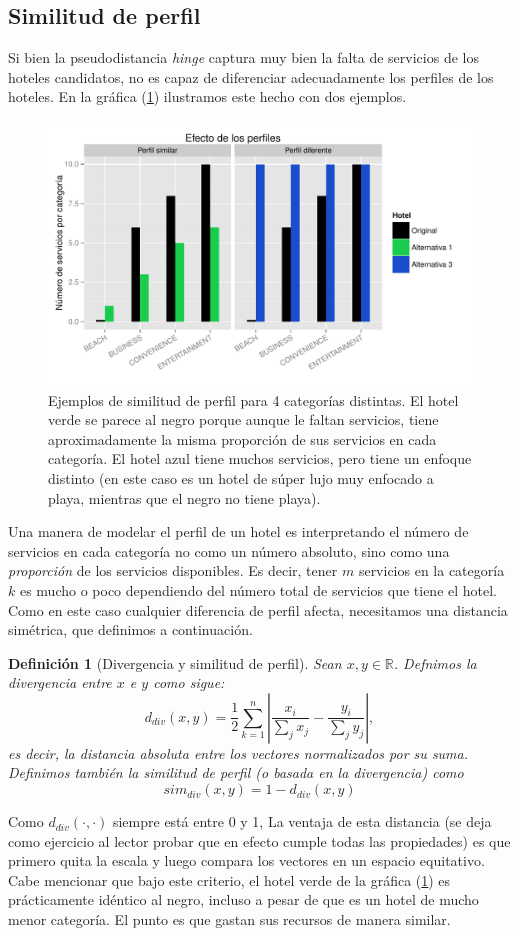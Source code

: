 \documentclass[12pt]{report}
\newtheorem{defn}{Definici\'on}[chapter]
\begin{document}
\subsection*{Similitud de perfil}

Si bien la pseudodistancia \emph{hinge} captura muy bien la falta de servicios de los hoteles candidatos, no es capaz de diferenciar adecuadamente los perfiles de los hoteles. En la gráfica (\ref{simperf}) ilustramos este hecho con dos ejemplos.
\begin{figure}[ht]
	\centering
	\includegraphics[width=\textwidth]{imagenes/simperf.pdf}
	\caption{\label{simperf} Ejemplos de similitud de perfil para 4 categorías distintas. El hotel verde se parece al negro porque aunque le faltan servicios, tiene aproximadamente la misma proporción de sus servicios en cada categoría. El hotel azul tiene muchos servicios, pero tiene un enfoque distinto (en este caso es un hotel de súper lujo muy enfocado a playa, mientras que el negro no tiene playa).}
\end{figure}
Una manera de modelar el perfil de un hotel es interpretando el número de servicios en cada categoría no como un número absoluto, sino como una \emph{proporción} de los servicios disponibles. Es decir, tener $m$ servicios en la categoría $k$ es mucho o poco dependiendo del número total de servicios que tiene el hotel. Como en este caso cualquier diferencia de perfil afecta, necesitamos una distancia simétrica, que definimos a continuación.
\begin{defn}[Divergencia y similitud de perfil]
Sean $x, y \in \mathbb{R}$. Defnimos la divergencia entre $x$ e $y$ como sigue:
\[
d_{div}(x, y) = \frac{1}{2}\sum_{k=1}^n \left|\frac{x_i}{\sum_j x_j} - \frac{y_i}{\sum_j y_j}\right|,
\]
es decir, la distancia absoluta entre los vectores normalizados por su suma. Definimos también la similitud de perfil (o basada en la divergencia) como
\[
sim_{div}(x,y) = 1 - d_{div}(x,y)
\]
\end{defn}
Como $d_{div}(\cdot, \cdot)$ siempre está entre 0 y 1, 
La ventaja de esta distancia (se deja como ejercicio al lector probar que en efecto cumple todas las propiedades) es que primero quita la escala y luego compara los vectores en un espacio equitativo. Cabe mencionar que bajo este criterio, el hotel verde de la gráfica (\ref{simperf}) es prácticamente idéntico al negro, incluso a pesar de que es un hotel de mucho menor categoría. El punto es que gastan sus recursos de manera similar.
\end{document}
